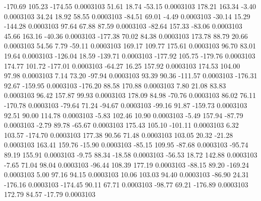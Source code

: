      -170.69      105.23     -174.55     0.0003103
       51.61       18.74      -53.15     0.0003103
      178.21      163.34       -3.40     0.0003103
       34.24       18.92       58.55     0.0003103
      -84.51       69.01       -4.49     0.0003103
      -30.14       15.29     -144.28     0.0003103
       97.64       67.88       87.59     0.0003103
      -82.64      157.33      -83.06     0.0003103
       45.66      163.16      -40.36     0.0003103
     -177.38       70.02       84.38     0.0003103
      173.78       88.79       20.66     0.0003103
       54.56        7.79      -59.11     0.0003103
      169.17      109.77      175.61     0.0003103
       96.70       83.01       19.64     0.0003103
     -126.04       18.59     -139.71     0.0003103
     -177.92      105.75     -179.76     0.0003103
      174.77      101.72     -177.01     0.0003103
      -64.27       16.25      157.92     0.0003103
      174.53      104.00       97.98     0.0003103
        7.14       73.20      -97.94     0.0003103
       93.39       90.36     -111.57     0.0003103
     -176.31       92.67     -159.95     0.0003103
     -176.20       88.58      170.88     0.0003103
        7.80       21.08       83.83     0.0003103
       96.42      157.87       99.93     0.0003103
      178.09       84.98      -70.76     0.0003103
       86.02       76.11     -170.78     0.0003103
      -79.64       71.24      -94.67     0.0003103
      -99.16       91.87     -159.73     0.0003103
       92.51       90.00      114.78     0.0003103
       -5.83      102.46       10.90     0.0003103
       -5.49      157.94      -87.79     0.0003103
       -2.79       89.78      -65.67     0.0003103
      175.43      105.10     -101.11     0.0003103
        6.32      103.57     -174.70     0.0003103
      177.38       90.56       71.48     0.0003103
      103.05       20.32      -21.28     0.0003103
      163.41      159.76      -15.90     0.0003103
      -85.15      109.95      -87.68     0.0003103
      -95.74       89.19      155.91     0.0003103
       -9.75       88.34      -18.58     0.0003103
      -56.53       18.72      142.88     0.0003103
       -7.65       71.04       98.04     0.0003103
      -96.44      108.39      177.19     0.0003103
      -88.15       89.20     -169.24     0.0003103
        5.00       97.16       94.15     0.0003103
       10.06      103.03       94.40     0.0003103
      -86.90       24.31     -176.16     0.0003103
     -174.45       90.11       67.71     0.0003103
      -98.77       69.21     -176.89     0.0003103
      172.79       84.57      -17.79     0.0003103
